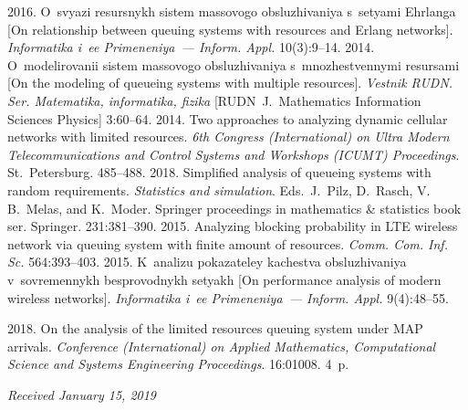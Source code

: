 \begin{multicols}{2}
{{\begin{thebibliography}{99}
 2016. 
O~svyazi resursnykh sistem massovogo obsluzhivaniya s~setyami Ehrlanga 
[On relationship between queuing systems with resources and Erlang networks]. 
\textit{Informatika i~ee Primeneniya~--- Inform. Appl.} 10(3):9--14.
 2014. 
O~mo\-de\-li\-ro\-va\-nii sistem massovogo obsluzhivaniya s~mno\-zhest\-ven\-ny\-mi 
resursami 
[On the modeling of queueing systems with multiple resources]. 
\textit{Vestnik RUDN. Ser. Matematika, informatika, fizika} [RUDN~J.~Mathematics 
Information Sciences Physics] 3:60--64.
 2014. Two approaches 
to analyzing dynamic cellular networks with limited resources. 
\textit{6th  Congress (International) on Ultra Modern Telecommunications 
and Control Systems and Workshops (ICUMT) Proceedings}. St.\ Petersburg. 485--488.
 2018. 
Simplified analysis of queueing systems with random requirements. 
\textit{Statistics and simulation}. Eds.\ J.~Pilz, D.~Rasch, V.\,B.~Melas, and K.~Moder.
Springer proceedings in mathematics \& statistics book ser.
Springer. 231:381--390.
 2015. Analyzing blocking probability 
in LTE wireless network via queuing system with finite amount of resources. 
\textit{Comm. Com. Inf. Sc.} 564:393--403.
2015. K~analizu pokazateley kachestva obsluzhivaniya 
v~sovremennykh besprovodnykh setyakh [On performance analysis of modern 
wireless networks]. \textit{Informatika i~ee Primeneniya~--- Inform. Appl.} 9(4):48--55.
{

}
 2018. On the analysis of the limited resources 
queuing system under MAP arrivals. \textit{Conference (International)
on Applied Mathematics, Computational Science and Systems Engineering  
Proceedings}. 16:01008. 4~p.
\end{thebibliography}

 }
 }

\end{multicols}

\vspace*{-6pt}

\hfill{\small\textit{Received January 15, 2019}}


